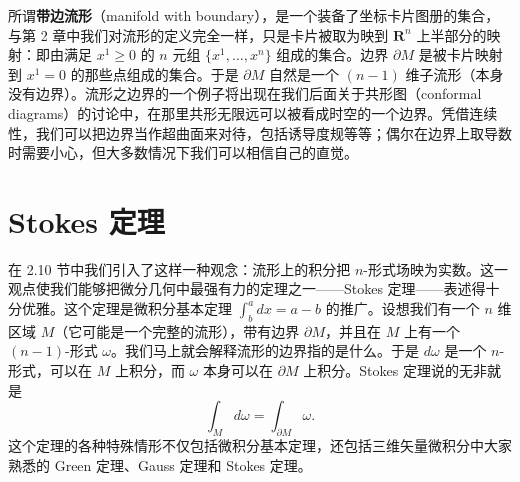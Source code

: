 所谓\textbf{带边流形}（manifold with boundary），是一个装备了坐标卡片图册的集合，与第 2 章中我们对流形的定义完全一样，只是卡片被取为映到 $\mathbf{R}^n$ 上半部分的映射：即由满足 $x^1 \geq 0$ 的 $n$ 元组 $\{x^1, \ldots, x^n\}$ 组成的集合。边界 $\partial M$ 是被卡片映射到 $x^1 = 0$ 的那些点组成的集合。于是 $\partial M$ 自然是一个 $(n-1)$ 维子流形（本身没有边界）。流形之边界的一个例子将出现在我们后面关于共形图（conformal diagrams）的讨论中，在那里共形无限远可以被看成时空的一个边界。凭借连续性，我们可以把边界当作超曲面来对待，包括诱导度规等等；偶尔在边界上取导数时需要小心，但大多数情况下我们可以相信自己的直觉。


\chapter{Stokes 定理}

在 2.10 节中我们引入了这样一种观念：流形上的积分把 $n$-形式场映为实数。这一观点使我们能够把微分几何中最强有力的定理之一——Stokes 定理——表述得十分优雅。这个定理是微积分基本定理 $\int_b^a dx = a - b$ 的推广。设想我们有一个 $n$ 维区域 $M$（它可能是一个完整的流形），带有边界 $\partial M$，并且在 $M$ 上有一个 $(n-1)$-形式 $\omega$。我们马上就会解释流形的边界指的是什么。于是 $d\omega$ 是一个 $n$-形式，可以在 $M$ 上积分，而 $\omega$ 本身可以在 $\partial M$ 上积分。Stokes 定理说的无非就是
\begin{equation*}
\boxed{\int_M d\omega = \int_{\partial M} \omega.}
\tag{E.1}
\end{equation*}
这个定理的各种特殊情形不仅包括微积分基本定理，还包括三维矢量微积分中大家熟悉的 Green 定理、Gauss 定理和 Stokes 定理。


